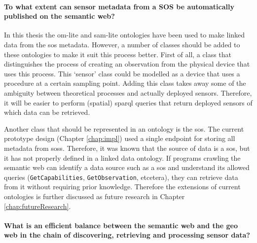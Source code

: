 \paragraph{To what extent can sensor metadata from a SOS be automatically published on the semantic web?}\mbox{}

In this thesis the om-lite and sam-lite ontologies have been used to make linked data from the \ac{sos} metadata. However, a number of classes should be added to these ontologies to make it suit this process better. First of all, a class that distinguishes the process of creating an observation from the physical device that uses this process. This `sensor' class could be modelled as a device that uses a procedure at a certain sampling point. Adding this class takes away some of the ambiguity between theoretical processes and actually deployed sensors. Therefore, it will be easier to perform (spatial) \ac{sparql} queries that return deployed sensors of which data can be retrieved.  

Another class that should be represented in an ontology is the \acl{sos}. The current prototype design (Chapter \ref{chap:impl}) used a single endpoint for storing all metadata from \aclp{sos}. Therefore, it was known that the source of data is a \ac{sos}, but it has not properly defined in a linked data ontology. If programs crawling the semantic web can identify a data source such as a \ac{sos} and understand its allowed queries (\texttt{GetCapabilities}, \texttt{GetObservation}, etcetera), they can retrieve data from it without requiring prior knowledge. Therefore the extensions of current ontologies is further discussed as future research in Chapter \ref{chap:futureResearch}.  


\paragraph{What is an efficient balance between the semantic web and the geo web in the chain of discovering, retrieving and processing sensor data?}\mbox{}



